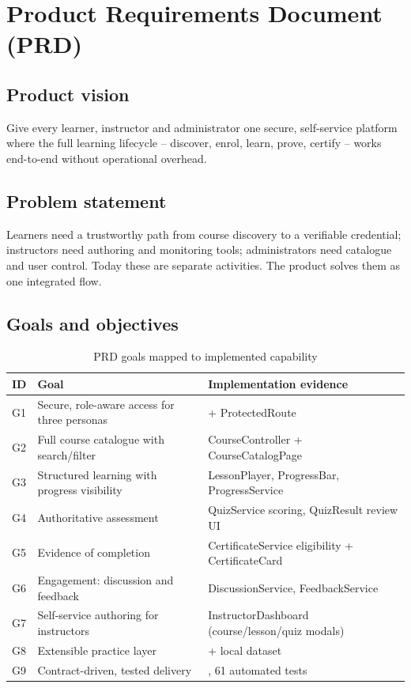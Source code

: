 \section{Product Requirements Document (PRD)}
\label{sec:prd}

\subsection{Product vision}

Give every learner, instructor and administrator one secure, self-service platform where the full learning lifecycle -- discover, enrol, learn, prove, certify -- works end-to-end without operational overhead.

\subsection{Problem statement}

Learners need a trustworthy path from course discovery to a verifiable credential; instructors need authoring and monitoring tools; administrators need catalogue and user control. Today these are separate activities. The product solves them as one integrated flow.

\subsection{Goals and objectives}

\begin{table}[H]
\centering
\caption{PRD goals mapped to implemented capability}
\label{tab:prd-goals}
\begin{tabular}{@{}C{1.4cm}L{8.4cm}L{4.4cm}@{}}
\toprule
\textbf{ID} & \textbf{Goal} & \textbf{Implementation evidence} \\
\midrule
G1 & Secure, role-aware access for three personas &  + ProtectedRoute \\
G2 & Full course catalogue with search/filter & CourseController + CourseCatalogPage \\
G3 & Structured learning with progress visibility & LessonPlayer, ProgressBar, ProgressService \\
G4 & Authoritative assessment & QuizService scoring, QuizResult review UI \\
G5 & Evidence of completion & CertificateService eligibility + CertificateCard \\
G6 & Engagement: discussion and feedback & DiscussionService, FeedbackService \\
G7 & Self-service authoring for instructors & InstructorDashboard (course/lesson/quiz modals) \\
G8 & Extensible practice layer &  + local dataset \\
G9 & Contract-driven, tested delivery & , 61 automated tests \\
\bottomrule
\end{tabular}
\end{table}


